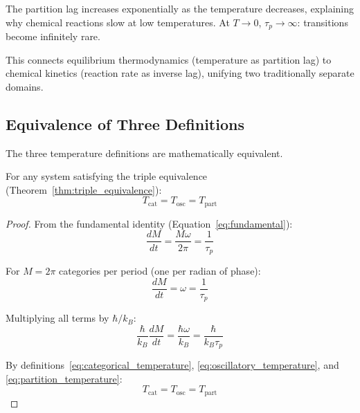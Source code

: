 The partition lag increases exponentially as the temperature decreases, explaining why chemical reactions slow at low temperatures. At $T \to 0$, $\tau_p \to \infty$: transitions become infinitely rare.

This connects equilibrium thermodynamics (temperature as partition lag) to chemical kinetics (reaction rate as inverse lag), unifying two traditionally separate domains.



\subsection{Equivalence of Three Definitions}

The three temperature definitions are mathematically equivalent.

\begin{theorem}
\label{thm:temperature_equivalence}
For any system satisfying the triple equivalence (Theorem~\ref{thm:triple_equivalence}):
\begin{equation}
T_{\text{cat}} = T_{\text{osc}} = T_{\text{part}}
\end{equation}
\end{theorem}

\begin{proof}
From the fundamental identity (Equation~\ref{eq:fundamental}):
\begin{equation}
\frac{dM}{dt} = \frac{M\omega}{2\pi} = \frac{1}{\tau_p}
\end{equation}

For $M = 2\pi$ categories per period (one per radian of phase):
\begin{equation}
\frac{dM}{dt} = \omega = \frac{1}{\tau_p}
\end{equation}

Multiplying all terms by $\hbar/k_B$:
\begin{equation}
\frac{\hbar}{k_B}\frac{dM}{dt} = \frac{\hbar\omega}{k_B} = \frac{\hbar}{k_B\tau_p}
\end{equation}

By definitions~\eqref{eq:categorical_temperature}, \eqref{eq:oscillatory_temperature}, and \eqref{eq:partition_temperature}:
\begin{equation}
T_{\text{cat}} = T_{\text{osc}} = T_{\text{part}}
\end{equation}
\end{proof}

